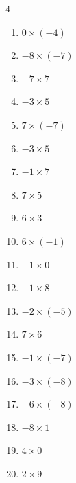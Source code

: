 \begin{multicols}{4}
\begin{enumerate}
  \item $0\times (-4)$
        \phantom{$=0$}

  \item $-8\times (-7)$
        \phantom{$=56$}

  \item $-7\times 7$
        \phantom{$=-49$}

  \item $-3\times 5$
        \phantom{$=-15$}

  \item $7\times (-7)$
        \phantom{$=-49$}

  \item $-3\times 5$
        \phantom{$=-15$}

  \item $-1\times 7$
        \phantom{$=-7$}

  \item $7\times 5$
        \phantom{$=35$}

  \item $6\times 3$
        \phantom{$=18$}

  \item $6\times (-1)$
        \phantom{$=-6$}

  \item $-1\times 0$
        \phantom{$=0$}

  \item $-1\times 8$
        \phantom{$=-8$}

  \item $-2\times (-5)$
        \phantom{$=10$}

  \item $7\times 6$
        \phantom{$=42$}

  \item $-1\times (-7)$
        \phantom{$=7$}

  \item $-3\times (-8)$
        \phantom{$=24$}

  \item $-6\times (-8)$
        \phantom{$=48$}

\columnbreak %

\resetques

  \item $-8\times 1$
        \phantom{$=-8$}

  \item $4\times 0$
        \phantom{$=0$}

  \item $2\times 9$
        \phantom{$=18$}


\end{enumerate}
\end{multicols}
